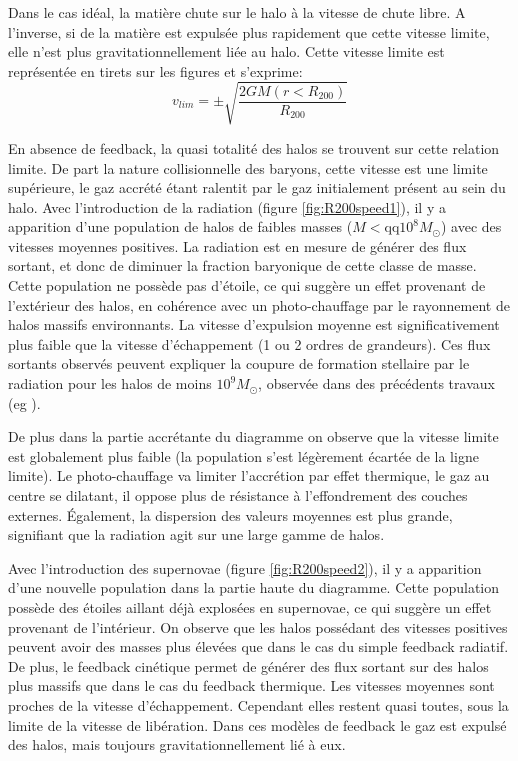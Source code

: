 Dans le cas idéal, la matière chute sur le halo à la vitesse de chute libre.
A l'inverse, si de la matière est expulsée plus rapidement que cette vitesse limite, elle n'est plus gravitationnellement liée au halo.
Cette vitesse limite est représentée en tirets sur les figures et s'exprime:
\begin{equation}
v_{lim} = \pm \sqrt{\frac{2 GM (r<R_{200})} {R_{200}} } 
\end{equation}

En absence de feedback, la quasi totalité des halos se trouvent sur cette relation limite.
De part la nature collisionnelle des baryons, cette vitesse est une limite supérieure, le gaz accrété étant ralentit par le gaz initialement présent au sein du halo.
Avec l'introduction de la radiation (figure \ref{fig:R200speed1}), il y a apparition d'une population de halos de faibles masses ($M< \mathrm{qq} 10^8 M_\odot$) avec des vitesses moyennes positives.
La radiation est en mesure de générer des flux sortant, et donc de diminuer la fraction baryonique de cette classe de masse. 
Cette population ne possède pas d'étoile, ce qui suggère un effet provenant de l'extérieur des halos, en cohérence avec un photo-chauffage par le rayonnement de halos massifs environnants.
La vitesse d'expulsion moyenne est significativement plus faible que la vitesse d'échappement (1 ou 2 ordres de grandeurs).
Ces flux sortants observés peuvent expliquer la coupure de formation stellaire par le radiation pour les halos de moins $10^9 M_\odot$, observée dans des précédents travaux (eg \cite{ocvirk_cosmic_2015}).

De plus dans la partie accrétante du diagramme on observe que la vitesse limite est globalement plus faible (la population s'est légèrement écartée de la ligne limite).
Le photo-chauffage va limiter l'accrétion par effet thermique, le gaz au centre se dilatant, il oppose plus de résistance à l'effondrement des couches externes.
Également, la dispersion des valeurs moyennes est plus grande, signifiant que la radiation agit sur une large gamme de halos.

Avec l'introduction des supernovae (figure \ref{fig:R200speed2}), il y a apparition d'une nouvelle population dans la partie haute du diagramme.
Cette population possède des étoiles aillant déjà explosées en supernovae, ce qui suggère un effet provenant de l'intérieur.
On observe que les halos possédant des vitesses positives peuvent avoir des masses plus élevées que dans le cas du simple feedback radiatif.
De plus, le feedback cinétique permet de générer des flux sortant sur des halos plus massifs que dans le cas du feedback thermique.
Les vitesses moyennes sont proches de la vitesse d'échappement.
Cependant elles restent quasi toutes, sous la limite de la vitesse de libération.
Dans ces modèles de feedback le gaz est expulsé des halos, mais toujours gravitationnellement lié à eux.

